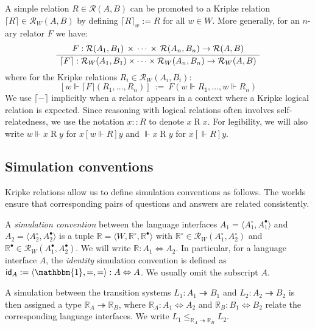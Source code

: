 \documentclass[sigplan,screen,review]{acmart}
\newcommand{\kw}[1]{\ensuremath{ \mathsf{#1} }}
\newcommand{\ifr}[1]{\mathrel{[{#1}]}}
\newcommand{\que}{\circ}
\newcommand{\ans}{\bullet}
\begin{document}
A simple relation $R \in \mathcal{R}(A, B)$
can be promoted to a Kripke relation
$\lceil R \rceil \in \mathcal{R}_W(A, B)$
by defining $\lceil R \rceil_w := R$ for all $w \in W$.
More generally, for an $n$-ary relator $F$ we have:
\[
  \AxiomC{$
    F :
      \mathcal{R}(A_1, B_1) \,\times\,\cdots\,\times\,\mathcal{R}(A_n, B_n)
      \rightarrow \mathcal{R}(A, B)$}
  \UnaryInfC{$
    \lceil F \rceil :
      \mathcal{R}_W(A_1, B_1) \times \cdots \times \mathcal{R}_W(A_n, B_n)
      \rightarrow \mathcal{R}_W(A, B)$}
  \DisplayProof
\]
where for the Kripke relations $R_i \in \mathcal{R}_W(A_i, B_i)$:
\[
  [w \Vdash \lceil F \rceil (R_1, \ldots, R_n)] \: := \:
    F(w \Vdash R_1, \ldots, w \Vdash R_n)
\]
We use $\lceil - \rceil$ implicitly
when a relator appears in a context where
a Kripke logical relation is expected.
Since reasoning with logical relations
often involves self-relatedness,
we use the notation
$x :: R$ to denote $x \mathrel{R} x$.
For legibility, we will also write
$w \Vdash x \mathrel{R} y$ for $x \ifr{w \Vdash R} y$
and $\Vdash x \mathrel{R} y$ for $x \ifr{\Vdash R} y$.


\subsection{Simulation conventions} \label{sec:simconv} %

Kripke relations allow us
to define simulation conventions as follows.
The worlds ensure that corresponding pairs of
questions and answers are related consistently.

\begin{definition} \label{def:simconv} %
A \emph{simulation convention} between the language interfaces
$A_1 = \langle A_1^\que, A_1^\ans \rangle$ and
$A_2 = \langle A_2^\que, A_2^\ans \rangle$
is a tuple $\mathbb{R} = \langle W, \mathbb{R}^\que, \mathbb{R}^\ans \rangle$
with $\mathbb{R}^\que \in \mathcal{R}_W(A_1^\que, A_2^\que)$
and $\mathbb{R}^\ans \in \mathcal{R}_W(A_1^\ans, A_2^\ans)$.
We will write $\mathbb{R} : A_1 \Leftrightarrow A_2$.
In particular,
for a language interface $A$,
the \emph{identity} simulation convention
is defined as
$\kw{id}_A := \langle \mathbbm{1}, {=}, {=} \rangle
  : A \Leftrightarrow A$.
We usually omit the subscript $A$.
\end{definition}

A simulation between the transition systems
$L_1 : A_1 \twoheadrightarrow B_1$ and
$L_2 : A_2 \twoheadrightarrow B_2$
is then assigned a type $\mathbb{R}_A \twoheadrightarrow \mathbb{R}_B$,
where %
$\mathbb{R}_A : A_1 \Leftrightarrow A_2$ and
$\mathbb{R}_B : B_1 \Leftrightarrow B_2$
relate the corresponding language interfaces.
We write
$L_1 \le_{\mathbb{R}_A \twoheadrightarrow \mathbb{R}_B} L_2$.
\end{document}
